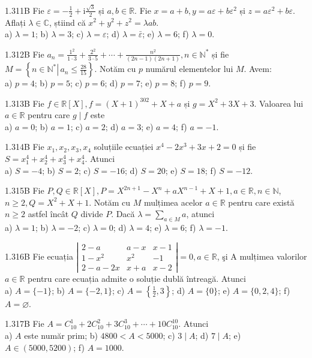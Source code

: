 \documentclass[11pt]{article}
\begin{document}
1.311B Fie $\varepsilon=-\frac{1}{2}+\mathrm{i} \frac{\sqrt{3}}{2}$ și $a, b \in \mathbb{R}$. Fie $x=a+b, y=a \varepsilon+b \varepsilon^{2}$ și $z=a \varepsilon^{2}+b \varepsilon$. Aflați $\lambda \in \mathbb{C}$, știind că $x^{2}+y^{2}+z^{2}=\lambda a b$.\\ a) $\lambda=1$; b) $\lambda=3$; c) $\lambda=\varepsilon$; d) $\lambda=\bar{\varepsilon}$; e) $\lambda=6$; f) $\lambda=0$.

1.312B Fie $a_{n}=\frac{1^{2}}{1 \cdot 3}+\frac{2^{2}}{3 \cdot 5}+\cdots+\frac{n^{2}}{(2 n-1)(2 n+1)}, n \in \mathbb{N}^{*}$ și fie $M=\left\{n \in \mathbb{N}^{*} \left\lvert\, a_{n} \leq \frac{28}{15}\right.\right\}$. Notăm cu $p$ numărul elementelor lui $M$. Avem:\\ a) $p=4$; b) $p=5$; c) $p=6$; d) $p=7$; e) $p=8$; f) $p=9$.

1.313B Fie $f \in \mathbb{R}[X], f=(X+1)^{302}+X+a$ și $g=X^{2}+3 X+3$. Valoarea lui $a \in \mathbb{R}$ pentru care $g \mid f$ este\\ a) $a=0$; b) $a=1$; c) $a=2$; d) $a=3$; e) $a=4$; f) $a=-1$.

1.314B Fie $x_{1}, x_{2}, x_{3}, x_{4}$ soluțiile ecuației $x^{4}-2 x^{3}+3 x+2=0$ și fie $S=x_{1}^{4}+x_{2}^{4}+x_{3}^{4}+x_{4}^{4}$. Atunci\\ a) $S=-4$; b) $S=2$; c) $S=-16$; d) $S=20$; e) $S=18$; f) $S=-12$.

1.315B Fie $P, Q \in \mathbb{R}[X], P=X^{2 n+1}-X^{n}+a X^{n-1}+X+1, a \in \mathbb{R}, n \in \mathbb{N}$, $n \geq 2, Q=X^{2}+X+1$. Notăm cu $M$ mulțimea acelor $a \in \mathbb{R}$ pentru care există $n \geq 2$ astfel încât $Q$ divide $P$. Dacă $\lambda=\sum_{a \in M} a$, atunci\\ a) $\lambda=1$; b) $\lambda=-2$; c) $\lambda=0$; d) $\lambda=4$; e) $\lambda=6$; f) $\lambda=-1$.

1.316B Fie ecuația $\left|\begin{array}{ccc}2-a & a-x & x-1 \\ 1-x^{2} & x^{2} & -1 \\ 2-a-2 x & x+a & x-2\end{array}\right|=0, a \in \mathbb{R}$, şi A mulțimea valorilor $a \in \mathbb{R}$ pentru care ecuația admite o soluție dublă întreagă. Atunci\\ a) $A=\{-1\}$; b) $A=\{-2,1\}$; c) $A=\left\{\frac{1}{2}, 3\right\}$; d) $A=\{0\}$; e) $A=\{0,2,4\}$; f) $A=\varnothing$.

1.317B Fie $A=C_{10}^{1}+2 C_{10}^{2}+3 C_{10}^{3}+\cdots+10 C_{10}^{10}$. Atunci\\ a) $A$ este număr prim; b) $4800<A<5000$; c) $3 \mid A$; d) $7 \mid A$; e) $A \in(5000,5200)$; f) $A=1000$.
\end{document}
